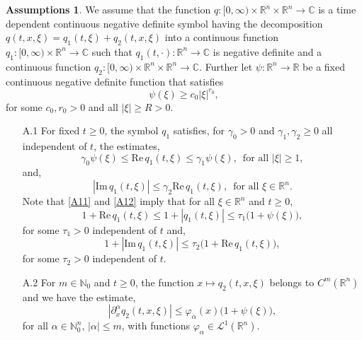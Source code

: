\documentclass[a4paper, 12pt]{report}
\theoremstyle{remark}
\theoremstyle{definition}
\newtheorem{assumptions}[theorem]{Assumptions}
\begin{document}
\begin{assumptions}\label{TDSTDSA1}
We assume that the function $q : [0, \infty) \times \mathbb{R}^n \times \mathbb{R}^n \to \mathbb{C}$ is a time dependent continuous negative definite symbol having the decomposition $q(t, x, \xi) = q_1(t, \xi) + q_2(t, x, \xi)$ into a continuous function $q_1 : [0, \infty) \times \mathbb{R}^n \to \mathbb{C}$ such that $q_1(t, \cdot) : \mathbb{R}^n \to \mathbb{C}$ is negative definite and a continuous function $q_2 : [0, \infty) \times \mathbb{R}^n \times \mathbb{R}^n \to \mathbb{C}$.  Further let $\psi : \mathbb{R}^n \to \mathbb{R}$ be a fixed continuous negative definite function that satisfies
\begin{equation}\label{GCfNDRF}
\psi(\xi) \ge c_0|\xi|^{r_0},
\end{equation}
for some $c_0, r_0 > 0$ and all $|\xi| \ge R > 0$.
\begin{itemize}
\item[A.1] For fixed $t \ge 0$, the symbol $q_1$ satisfies, for $\gamma_0 > 0$ and $\gamma_1, \gamma_2 \ge 0$ all independent of $t$, the estimates,
\begin{equation}
\gamma_0\psi(\xi) \le \text{Re}\,q_1(t, \xi) \le \gamma_1\psi(\xi), \,\,\, \text{for all } |\xi| \ge 1,\label{A11}
\end{equation}
and,
\begin{equation}
|\text{Im}\,q_1(t, \xi)| \le \gamma_2\text{Re}\,q_1(t, \xi), \,\,\, \text{for all } \xi \in \mathbb{R}^n.\label{A12}
\end{equation}
Note that \eqref{A11} and \eqref{A12} imply that for all $\xi \in \mathbb{R}^n$ and $t \ge 0$,
\begin{equation}
1 + \text{Re}\,q_1(t, \xi) \le 1 + |q_1(t, \xi)| \le \tau_1\big(1 + \psi(\xi)\big),\label{C11}
\end{equation}
for some $\tau_1 > 0$ independent of $t$ and,
\begin{equation}
1 + |\text{Im}\,q_1(t, \xi)| \le \tau_2\big(1 + \text{Re}\,q_1(t, \xi)\big),\label{C12}
\end{equation}
for some $\tau_2 > 0$ independent of $t$.

\item[A.2] For $m \in \mathbb{N}_0$ and $t \ge 0$, the function $x \mapsto q_2(t, x, \xi)$ belongs to $C^m(\mathbb{R}^n)$ and we have the estimate,
\begin{equation}
|\partial_x^\alpha q_2(t, x, \xi)| \le \varphi_\alpha(x)\big(1 + \psi(\xi)\big),\label{A21}
\end{equation}
for all $\alpha \in \mathbb{N}_0^n$, $|\alpha| \le m$, with functions $\varphi_\alpha \in \mathcal{L}^1(\mathbb{R}^n)$.
\end{itemize}
\end{assumptions}
\end{document}
